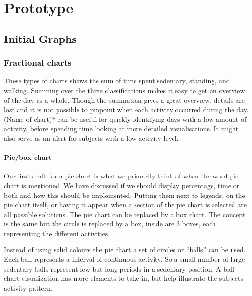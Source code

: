 \chapter{Prototype} %

\label{Chapter5} %


\section{Initial Graphs}

\subsection{Fractional charts}
These types of charts shows the sum of time spent sedentary, standing, and walking. Summing over the three classifications makes it easy to get an overview of the day as a whole. Though the summation gives a great overview, details are lost and it is not possible to pinpoint when each activity occurred during the day. (Name of chart)* can be useful for quickly identifying days with a low amount of activity, before spending time looking at more detailed visualisations. It might also serve as an alert for subjects with a low activity level.

\subsubsection{Pie/box chart}
Our first draft for a pie chart is what we primarily think of when the word pie chart is mentioned. We have discussed if we should display percentage, time or both and how this should be implemented. Putting them next to legends, on the pie chart itself, or having it appear when a section of the pie chart is selected are all possible solutions. The pie chart can be replaced by a box chart. The concept is the same but the circle is replaced by a box, inside are 3 boxes, each representing the different activities.

Instead of using solid colours the pie chart a set of circles or ``balls'' can be used. Each ball represents a interval of continuous activity. So a small number of large sedentary balls represent few but long periods in a sedentary position. A ball chart visualization has more elements to take in, but help illustrate the subjects activity pattern.

